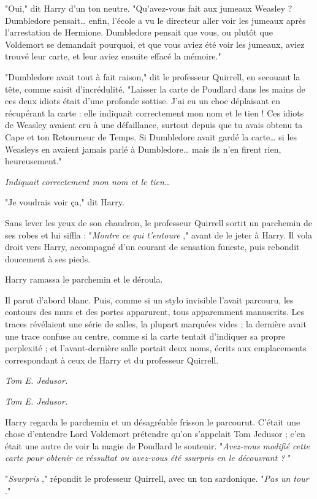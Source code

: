 "Oui," dit Harry d'un ton neutre. "Qu'avez-vous fait aux jumeaux Weasley ? Dumbledore pensait… enfin, l'école a vu le directeur aller voir les jumeaux après l'arrestation de Hermione. Dumbledore pensait que vous, ou plutôt que Voldemort se demandait pourquoi, et que vous aviez été voir les jumeaux, aviez trouvé leur carte, et leur aviez ensuite effacé la mémoire."

"Dumbledore avait tout à fait raison," dit le professeur Quirrell, en secouant la tête, comme saisit d'incrédulité. "Laisser la carte de Poudlard dans les mains de ces deux idiots était d'une profonde sottise. J'ai eu un choc déplaisant en récupérant la carte : elle indiquait correctement mon nom et le tien ! Ces idiots de Weasley avaient cru à une défaillance, surtout depuis que tu avais obtenu ta Cape et ton Retourneur de Temps. Si Dumbledore avait gardé la carte… si les Weasleys en avaient jamais parlé à Dumbledore… mais ils n'en firent rien, heureusement."

\emph{Indiquait correctement mon nom et le tien…} 

"Je voudrais voir ça," dit Harry.

Sans lever les yeux de son chaudron, le professeur Quirrell sortit un parchemin de ses robes et lui siffla : "\emph{Montre ce qui t'entoure} ," avant de le jeter à Harry. Il vola droit vers Harry, accompagné d'un courant de sensation funeste, puis rebondit doucement à ses pieds.

Harry ramassa le parchemin et le déroula.

Il parut d'abord blanc. Puis, comme si un stylo invisible l'avait parcouru, les contours des murs et des portes apparurent, tous apparemment manuscrits. Les traces révélaient une série de salles, la plupart marquées vides ; la dernière avait une trace confuse au centre, comme si la carte tentait d'indiquer sa propre perplexité ; et l'avant-dernière salle portait deux noms, écrits aux emplacements correspondant à ceux de Harry et du professeur Quirrell.

\emph{Tom E. Jedusor.} 

\emph{Tom E. Jedusor.} 

Harry regarda le parchemin et un désagréable frisson le parcourut. C'était une chose d'entendre Lord Voldemort prétendre qu'on s'appelait Tom Jedusor ; c'en était une autre de voir la magie de Poudlard le soutenir. "\emph{Avez-vous modifié cette carte pour obtenir ce réssultat ou avez-vous été ssurpris en le découvrant ?} "

"\emph{Ssurpris} ," répondit le professeur Quirrell, avec un ton sardonique. "\emph{Pas un tour} ."

